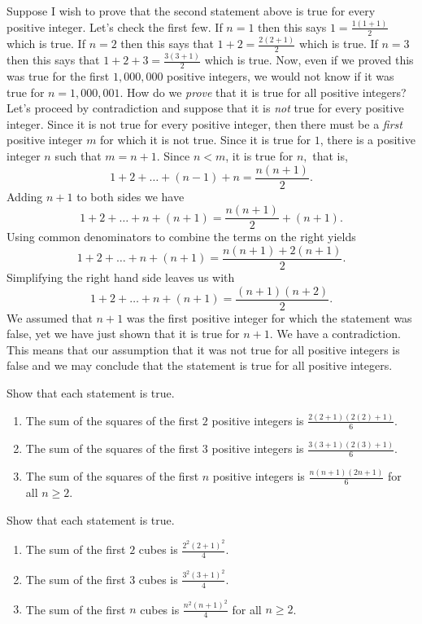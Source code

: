 Suppose I wish to prove that the second statement above is true for every positive integer. Let's check the first few. If $n=1$ then this says $1 =  \frac{1(1+1)}{2}$ which is true. If $n=2$ then this says that $1 + 2 = \frac{2(2+1)}{2}$ which is true. If $n=3$ then this says that $1 + 2 + 3 = \frac{3(3+1)}{2}$ which is true. Now, even if we proved this was true for the first $1,000,000$ positive integers, we would not know if it was true for  $n=1,000,001$. How do we \emph{prove} that it is true for all positive integers?  Let's proceed by contradiction and suppose that it is \emph{not} true for every positive integer. Since it is not true for every positive integer, then there must be a \emph{first} positive integer $m$ for which it is not true.  Since it is true for $1$, there is a positive integer $n$ such that $m=n+1$. Since $n < m$, it is true for $n,$ that is,
$$1 + 2 + \dots + (n-1) + n = \frac{n(n+1)}{2}.$$
Adding $n+1$ to both sides we have
$$1 + 2 + \dots + n + (n+1) = \frac{n(n+1)}{2} + (n+1).$$
Using common denominators to combine the terms on the right yields
$$1 + 2 + \dots + n + (n+1) = \frac{n(n+1)+2(n+1)}{2}.$$
Simplifying the right hand side leaves us with
$$1 + 2 + \dots + n + (n+1) = \frac{(n+1)(n+2)}{2}.$$
We assumed that $n+1$ was the first positive integer for which the statement was false, yet we have just shown that it is true for $n+1$.  We have a contradiction.  This means that our assumption that it was not true for all positive integers is false and we may conclude that the statement is true for all positive integers.

\begin{prb} Show that each statement is true.
\begin{enumerate}
\item The sum of the squares of the first $2$ positive integers is $\frac{2(2+1)(2(2)+1)}{6}$.
\item The sum of the squares of the first $3$ positive integers is $\frac{3(3+1)(2(3)+1)}{6}$.
\item The sum of the squares of the first $n$ positive integers is $\frac{n(n+1)(2n+1)}{6}$ for all $n \geq 2$.
\end{enumerate}
\end{prb}

\begin{prb} Show that each statement is true.
\begin{enumerate}
\item The sum of the first $2$ cubes is  $\frac{2^2 (2+1)^2}{4}$.
\item The sum of the first $3$ cubes is  $\frac{3^2 (3+1)^2}{4}$.
\item The sum of the first $n$ cubes is $\frac{n^2 (n+1)^2}{4}$ for all $n \geq 2$.
\end{enumerate}
\end{prb}

